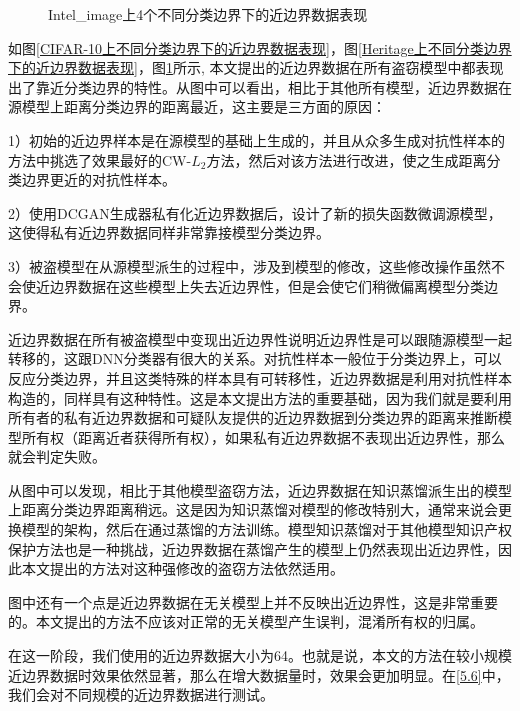 \begin{figure}[!htb]
	\centering
	\caption{Intel\_image上4个不同分类边界下的近边界数据表现}
	\label{Intel-image上不同分类边界下的近边界数据表现}
\end{figure}

如图\ref{CIFAR-10上不同分类边界下的近边界数据表现}，图\ref{Heritage上不同分类边界下的近边界数据表现}，图\ref{Intel-image上不同分类边界下的近边界数据表现}所示, 本文提出的近边界数据在所有盗窃模型中都表现出了靠近分类边界的特性。从图中可以看出，相比于其他所有模型，近边界数据在源模型上距离分类边界的距离最近，这主要是三方面的原因：

1）初始的近边界样本是在源模型的基础上生成的，并且从众多生成对抗性样本的方法中挑选了效果最好的CW-$L_2$方法，然后对该方法进行改进，使之生成距离分类边界更近的对抗性样本。

2）使用DCGAN生成器私有化近边界数据后，设计了新的损失函数微调源模型，这使得私有近边界数据同样非常靠接模型分类边界。

3）被盗模型在从源模型派生的过程中，涉及到模型的修改，这些修改操作虽然不会使近边界数据在这些模型上失去近边界性，但是会使它们稍微偏离模型分类边界。


近边界数据在所有被盗模型中变现出近边界性说明近边界性是可以跟随源模型一起转移的，这跟DNN分类器有很大的关系。对抗性样本一般位于分类边界上，可以反应分类边界，并且这类特殊的样本具有可转移性，近边界数据是利用对抗性样本构造的，同样具有这种特性。这是本文提出方法的重要基础，因为我们就是要利用所有者的私有近边界数据和可疑队友提供的近边界数据到分类边界的距离来推断模型所有权（距离近者获得所有权），如果私有近边界数据不表现出近边界性，那么就会判定失败。

从图中可以发现，相比于其他模型盗窃方法，近边界数据在知识蒸馏派生出的模型上距离分类边界距离稍远。这是因为知识蒸馏对模型的修改特别大，通常来说会更换模型的架构，然后在通过蒸馏的方法训练。模型知识蒸馏对于其他模型知识产权保护方法也是一种挑战，近边界数据在蒸馏产生的模型上仍然表现出近边界性，因此本文提出的方法对这种强修改的盗窃方法依然适用。

图中还有一个点是近边界数据在无关模型上并不反映出近边界性，这是非常重要的。本文提出的方法不应该对正常的无关模型产生误判，混淆所有权的归属。

在这一阶段，我们使用的近边界数据大小为64。也就是说，本文的方法在较小规模近边界数据时效果依然显著，那么在增大数据量时，效果会更加明显。在\ref{5.6}中，我们会对不同规模的近边界数据进行测试。

